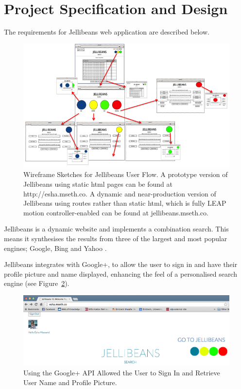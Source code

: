 \documentclass[a4paper, 11pt]{article}
\begin{document}
\section{Project Specification and Design} 

The requirements for Jellibeans web application are described below. 

\begin{figure}[H]
\begin{center}
\includegraphics[scale=0.65]{JellibeanUserFlow.png}
\end{center}
\caption{Wireframe Sketches for Jellibeans User Flow. A prototype version of Jellibeans using static html pages can be found at http://esha.mseth.co. A dynamic and near-production version of Jellibeans using routes rather than static html, which is fully LEAP motion controller-enabled can be found at jellibeans.mseth.co. }
\label{JBeanUserFlow}
\end{figure}


\vspace{5mm}
Jellibeans is a dynamic website and implements a combination search. This means it synthesises the results from three of the largest and most popular engines; Google, Bing and Yahoo \cite{adam}.

\vspace{5mm}
Jellibeans integrates with Google+, to allow the user to sign in and have their profile picture and name displayed, enhancing the feel of a personalised search engine (see Figure~\ref{googlesignin}).

\begin{figure}[H]
\begin{center}
\includegraphics[scale=0.25]{helloEsha}
\end{center}
\caption{Using the Google+ API Allowed the User to Sign In and Retrieve User Name and Profile Picture.}
\label{googlesignin}
\end{figure}
\end{document}
